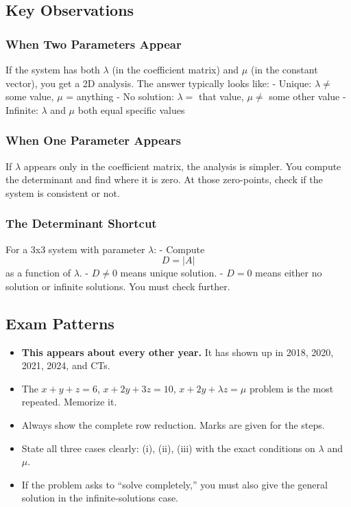 \documentclass[
]{article}
\providecommand{\tightlist}{%
  \setlength{\itemsep}{0pt}\setlength{\parskip}{0pt}}
\begin{document}
\subsection{Key Observations}\label{key-observations}

\subsubsection{When Two Parameters
Appear}\label{when-two-parameters-appear}

If the system has both \(\lambda\) (in the coefficient matrix) and
\(\mu\) (in the constant vector), you get a 2D analysis. The answer
typically looks like: - Unique: \(\lambda \neq\) some value, \(\mu\) =
anything - No solution: \(\lambda =\) that value, \(\mu \neq\) some
other value - Infinite: \(\lambda\) and \(\mu\) both equal specific
values

\subsubsection{When One Parameter
Appears}\label{when-one-parameter-appears}

If \(\lambda\) appears only in the coefficient matrix, the analysis is
simpler. You compute the determinant and find where it is zero. At those
zero-points, check if the system is consistent or not.

\subsubsection{The Determinant Shortcut}\label{the-determinant-shortcut}

For a 3x3 system with parameter \(\lambda\): - Compute
\[
D = \lvert A \rvert
\]
as a function of \(\lambda\). - \(D \neq 0\) means unique solution. -
\(D = 0\) means either no solution or infinite solutions. You must check
further.

\subsection{Exam Patterns}\label{exam-patterns-23}

\begin{itemize}
\tightlist
\item
  \textbf{This appears about every other year.} It has shown up in 2018,
  2020, 2021, 2024, and CTs.
\item
  The \(x+y+z=6\), \(x+2y+3z=10\), \(x+2y+\lambda z=\mu\) problem is the
  most repeated. Memorize it.
\item
  Always show the complete row reduction. Marks are given for the steps.
\item
  State all three cases clearly: (i), (ii), (iii) with the exact
  conditions on \(\lambda\) and \(\mu\).
\item
  If the problem asks to ``solve completely,'' you must also give the
  general solution in the infinite-solutions case.
\end{itemize}
\end{document}

